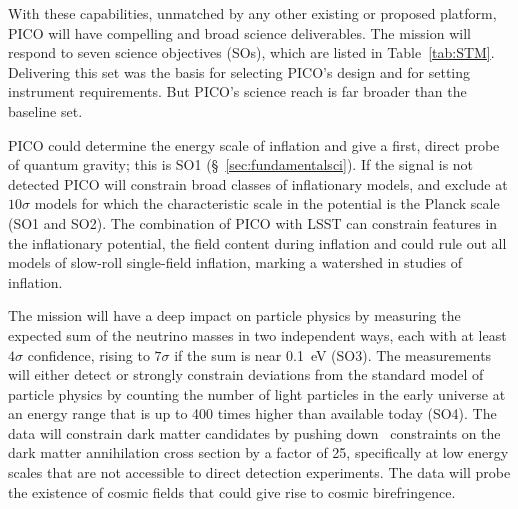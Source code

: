 \documentclass[PICOReport.tex]{subfiles}
\begin{document}
With these capabilities, unmatched by any other existing or proposed platform, PICO will have compelling and broad science deliverables. The mission will respond to seven science objectives (SOs), which are listed in Table~\ref{tab:STM}. Delivering this set was the basis for selecting PICO's design and for setting instrument requirements. But PICO's science reach is far broader than the baseline set. 

PICO could determine the energy scale of inflation and give a first, direct probe of quantum gravity; this is SO1 (\S~\ref{sec:fundamentalsci}). If the signal is not detected PICO will constrain broad classes of inflationary models, and exclude at $10\sigma$ models for which the characteristic scale in the potential is the Planck scale (SO1 and SO2). The combination of PICO with LSST can constrain features in the inflationary potential, the field content during inflation and could rule out all models of slow-roll single-field inflation, marking a watershed in studies of inflation. 

The mission will have a deep impact on particle physics by measuring the expected sum of the neutrino masses in two independent ways, each with at least $4\sigma$ confidence, rising to $7\sigma$ if the sum is near 0.1~eV (SO3).  The measurements will either detect or strongly constrain deviations from the standard model of particle physics by counting the number of light particles in the early universe at an energy range that is up to 400 times higher than available today  (SO4). The data will constrain dark matter candidates by pushing down \planck\ constraints on the dark matter annihilation cross section by a factor of 25, specifically at low energy scales that are not accessible to direct detection experiments. The data will probe the existence of cosmic fields that could give rise to cosmic birefringence. 
\end{document}
